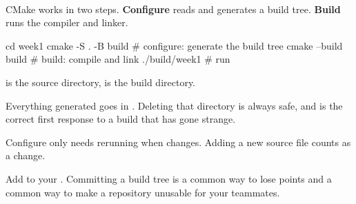\documentclass[
    10pt,
    dvipsnames,
    svgnames,
    x11names,
    aspectratio=1610,
    english,
    codeminted]{beamer}
\begin{document}
\begin{frame}[fragile]{\secname}
\framesubtitle{\subsecname}
CMake works in two steps. \textbf{Configure} reads  and generates a build tree. \textbf{Build} runs the compiler and linker.

\begin{bashcodebasic}[][fontsize=\footnotesize]
cd week1
cmake -S . -B build      # configure: generate the build tree
cmake --build build      # build: compile and link
./build/week1         # run
\end{bashcodebasic}

\begin{compactitem}
\small
    \item {} is the source directory,  is the build directory.
    \item Everything generated goes in . Deleting that directory is always safe, and is the correct first response to a build that has gone strange.
    \item Configure only needs rerunning when  changes. Adding a new source file counts as a change.
\end{compactitem}

\medskip
\begin{MyBox}
Add  to your . Committing a build tree is a common way to lose points and a common way to make a repository unusable for your teammates.
\end{MyBox}
\end{frame}

\end{document}
